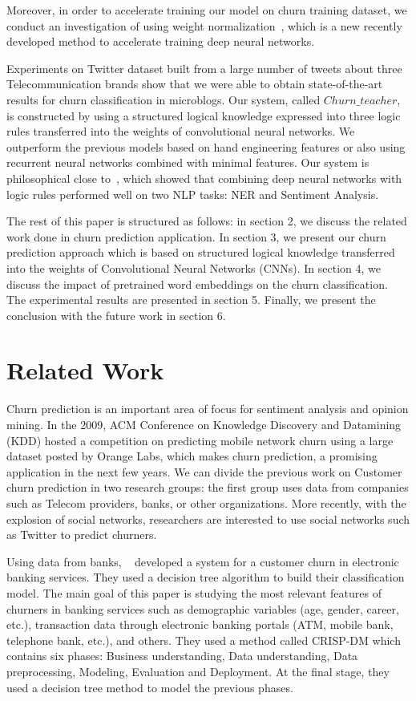 \documentclass[11pt,letterpaper]{article}
\begin{document}
Moreover, in order to accelerate training our model on churn training dataset, we conduct an investigation of using weight normalization~\cite{salimans}, which is a new recently developed method to accelerate training deep neural networks. 

Experiments on Twitter dataset built from a large number of tweets about three Telecommunication brands show that we were able to obtain state-of-the-art results for churn classification in microblogs. Our system, called \(Churn\_teacher\), is constructed by using a structured logical knowledge expressed into three logic rules transferred into the weights of convolutional neural networks. We outperform the previous models based on hand engineering features or also using recurrent neural networks combined with minimal features.  Our system is philosophical close to~\cite{hu}, which showed that combining deep neural networks with logic rules performed well on two NLP tasks: NER and Sentiment Analysis. 

The rest of this paper is structured as follows: in section 2, we discuss the related work done in churn prediction application. In section 3, we present our churn prediction approach which is based on structured logical knowledge transferred into the weights of  Convolutional Neural Networks (CNNs). In section 4, we discuss the impact of pretrained word embeddings on the churn classification. The experimental results are presented in section 5. Finally, we present the conclusion with the future work in section 6.

\section{Related Work}

Churn prediction is an important area of focus for sentiment analysis and opinion mining. In the 2009, ACM Conference on Knowledge Discovery and Datamining (KDD) hosted a competition on predicting mobile network churn using a large dataset posted by Orange Labs, which makes churn prediction, a promising application in the next few years. We can divide the previous work on Customer churn prediction in two research groups: the first group uses data from companies such as Telecom providers, banks, or other organizations. More recently, with the explosion of social networks, researchers are interested to use social networks such as Twitter to predict churners.

Using data from banks, ~\cite{keramati} developed a system for a customer churn in electronic banking services. They used a decision tree algorithm to build their classification model. The main goal of this paper is studying the most relevant features of churners in banking services such as demographic variables (age, gender, career, etc.), transaction data through electronic banking portals (ATM, mobile bank, telephone bank, etc.), and others. They used a method called CRISP-DM which contains six phases: Business understanding, Data understanding, Data preprocessing, Modeling, Evaluation and Deployment. At the final stage, they used a decision tree method to model the previous phases.
\end{document}

